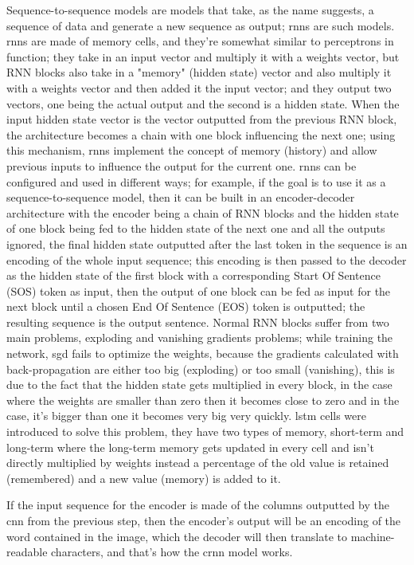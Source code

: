 Sequence-to-sequence models are models that take, as the name suggests, a sequence of data and generate a new sequence as output; \gls{rnn}s are such models. \gls{rnn}s are made of memory cells, and they're somewhat similar to perceptrons in function; they take in an input vector and multiply it with a weights vector, but RNN blocks also take in a "memory" (hidden state) vector and also multiply it with a weights vector and then added it the input vector; and they output two vectors, one being the actual output and the second is a hidden state. When the input hidden state vector is the vector outputted from the previous RNN block, the architecture becomes a chain with one block influencing the next one; using this mechanism, \gls{rnn}s implement the concept of memory (history) and allow previous inputs to influence the output for the current one. \gls{rnn}s can be configured and used in different ways; for example, if the goal is to use it as a sequence-to-sequence model, then it can be built in an encoder-decoder architecture with the encoder being a chain of RNN blocks and the hidden state of one block being fed to the hidden state of the next one and all the outputs ignored, the final hidden state outputted after the last token in the sequence is an encoding of the whole input sequence; this encoding is then passed to the decoder as the hidden state of the first block with a corresponding Start Of Sentence (SOS) token as input, then the output of one block can be fed as input for the next block until a chosen End Of Sentence (EOS) token is outputted; the resulting sequence is the output sentence.
Normal RNN blocks suffer from two main problems, exploding and vanishing gradients problems; while training the network, \gls{sgd} fails to optimize the weights, because the gradients calculated with back-propagation are either too big (exploding) or too small (vanishing), this is due to the fact that the hidden state gets multiplied in every block, in the case where the weights are smaller than zero then it becomes close to zero and in the case, it's bigger than one it becomes very big very quickly. \gls{lstm} cells were introduced to solve this problem, they have two types of memory, short-term and long-term where the long-term memory gets updated in every cell and isn't directly multiplied by weights instead a percentage of the old value is retained (remembered) and a new value (memory) is added to it.

If the input sequence for the encoder is made of the columns outputted by the \gls{cnn} from the previous step, then the encoder's output will be an encoding of the word contained in the image, which the decoder will then translate to machine-readable characters, and that's how the \gls{crnn} model \cite{shi_end--end_2017} works.

